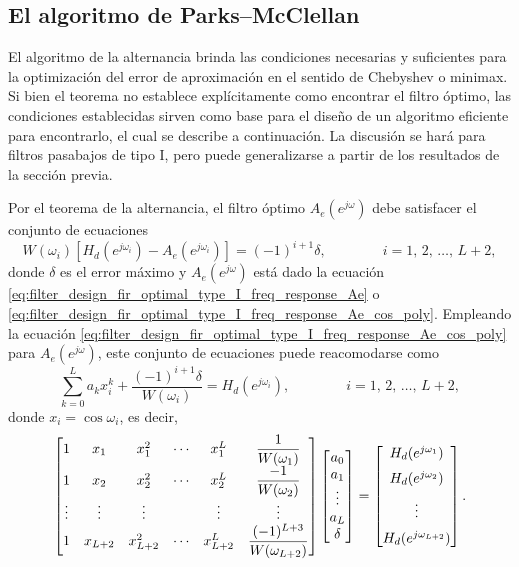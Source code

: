 \documentclass[a4paper]{report}
\begin{document}
\subsection{El algoritmo de Parks--McClellan}

El algoritmo de la alternancia brinda las condiciones necesarias y suficientes para la optimización del error de aproximación en el sentido de Chebyshev o minimax. Si bien el teorema no establece explícitamente como encontrar el filtro óptimo, las condiciones establecidas sirven como base para el diseño de un algoritmo eficiente para encontrarlo, el cual se describe a continuación. La discusión se hará para filtros pasabajos de tipo I, pero puede generalizarse a partir de los resultados de la sección previa.

Por el teorema de la alternancia, el filtro óptimo \(A_e(e^{j\omega})\) debe satisfacer el conjunto de ecuaciones
\[
 W(\omega_i)[H_d(e^{j\omega_i})-A_e(e^{j\omega_i})]=(-1)^{i+1}\delta,
 \qquad\qquad
 i=1,\,2,\,\dots,\,L+2,
\]
donde \(\delta\) es el error máximo y \(A_e(e^{j\omega})\) está dado la ecuación  \ref{eq:filter_design_fir_optimal_type_I_freq_response_Ae} o \ref{eq:filter_design_fir_optimal_type_I_freq_response_Ae_cos_poly}. Empleando la ecuación \ref{eq:filter_design_fir_optimal_type_I_freq_response_Ae_cos_poly} para \(A_e(e^{j\omega})\), este conjunto de ecuaciones puede reacomodarse como
\[
 \sum_{k=0}^La_kx_i^k+\frac{(-1)^{i+1}\delta}{W(\omega_i)}=H_d(e^{j\omega_i}),
 \qquad\qquad
 i=1,\,2,\,\dots,\,L+2,
\]
donde \(x_i=\cos\omega_i\), es decir,
\begin{equation}\label{eq:filter_design_fir_pm_equations_set}
 \begin{bmatrix}
  1 & x_1 & x_1^2 & \cdots & x_1^L & \dfrac{1}{W(\omega_1)}\\
  1 & x_2 & x_2^2 & \cdots & x_2^L & \dfrac{-1}{W(\omega_2)}\\
  \vdots & \vdots & \vdots &  & \vdots & \vdots\\
  1 & x_{L+2} & x_{L+2}^2 & \cdots & x_{L+2}^L & \dfrac{(-1)^{L+3}}{W(\omega_{L+2})}
 \end{bmatrix}
 \begin{bmatrix}
  a_0 \\ a_1 \\ \vdots \\ a_L \\ \delta
 \end{bmatrix}=
 \begin{bmatrix}
  H_d(e^{j\omega_1}) \\[\medskipamount] 
  H_d(e^{j\omega_2}) \\[\medskipamount] 
  \vdots \\[\medskipamount] 
  H_d(e^{j\omega_{L+2}})
 \end{bmatrix}. 
\end{equation}
\end{document}
